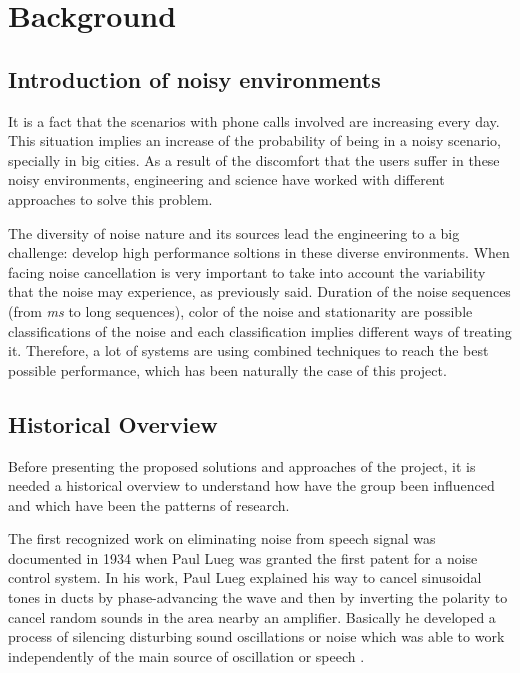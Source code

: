 \documentclass[11pt,a4paper,english]{book}  %
\theoremstyle{definition}  %
\theoremstyle{plain}  %
\theoremstyle{remark}  %
\begin{document}
\pagebreak\tableofcontents
\pagebreak

\chapter{Background}

	\section{Introduction of noisy environments}
	\label{sec:intronoise}
	
It is a fact that the scenarios with phone calls involved are increasing every day. This situation implies an increase of the probability of being in a noisy scenario, specially in big cities. As a result of the discomfort that the users suffer in these noisy environments, engineering and science have worked with different approaches to solve this problem.

The diversity of noise nature and its sources lead the engineering to a big challenge: develop high performance soltions in these diverse environments. When facing noise cancellation is very important to take into account the variability that the noise may experience, as previously said. Duration of the noise sequences (from \textit{ms} to long sequences), color of the noise and stationarity are possible classifications of the noise and each classification implies different ways of treating it. Therefore, a lot of systems are using combined techniques to reach the best possible performance, which has been naturally the case of this project.

	\section{Historical Overview}
	\label{sec:historia}
	Before presenting the proposed solutions and approaches of the project, it is needed a historical overview to understand how have the group been influenced and which have been the patterns of research.
	
	The first recognized work on eliminating noise from speech signal was documented in 1934 when Paul Lueg was granted the first patent for a noise control system. In his work, Paul Lueg explained his way to cancel sinusoidal tones in ducts by phase-advancing the wave and then by inverting the polarity to cancel random sounds in the area nearby an amplifier. Basically he developed a process of silencing disturbing sound oscillations or noise which was able to work independently of the main source of oscillation or speech \cite{patent1}. 
	
\end{document}
